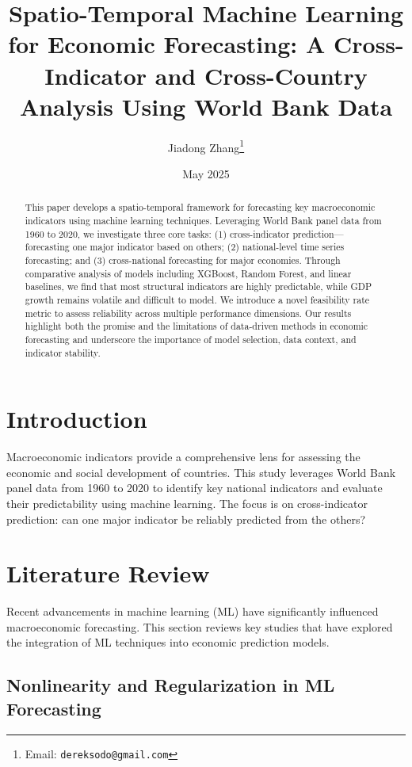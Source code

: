 \documentclass[12pt]{article}
\title{Spatio-Temporal Machine Learning for Economic Forecasting: A Cross-Indicator and Cross-Country Analysis Using World Bank Data}
\author{Jiadong Zhang\thanks{Email: \texttt{dereksodo@gmail.com}}}
\date{May 2025}
\begin{document}
\maketitle

\begin{abstract}
This paper develops a spatio-temporal framework for forecasting key macroeconomic indicators using machine learning techniques. Leveraging World Bank panel data from 1960 to 2020, we investigate three core tasks: (1) cross-indicator prediction—forecasting one major indicator based on others; (2) national-level time series forecasting; and (3) cross-national forecasting for major economies. Through comparative analysis of models including XGBoost, Random Forest, and linear baselines, we find that most structural indicators are highly predictable, while GDP growth remains volatile and difficult to model. We introduce a novel feasibility rate metric to assess reliability across multiple performance dimensions. Our results highlight both the promise and the limitations of data-driven methods in economic forecasting and underscore the importance of model selection, data context, and indicator stability.
\end{abstract}

\newpage
\tableofcontents
\newpage


\section{Introduction}

Macroeconomic indicators provide a comprehensive lens for assessing the economic and social development of countries. This study leverages World Bank panel data from 1960 to 2020 to identify key national indicators and evaluate their predictability using machine learning. The focus is on cross-indicator prediction: can one major indicator be reliably predicted from the others?
\section{Literature Review}

Recent advancements in machine learning (ML) have significantly influenced macroeconomic forecasting. This section reviews key studies that have explored the integration of ML techniques into economic prediction models.

\subsection{Nonlinearity and Regularization in ML Forecasting}
\end{document}
